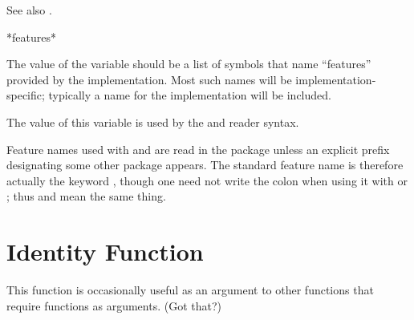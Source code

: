 \noindent
See also .



\begin{defun}[Variable]
*features*

The value of the variable  should be a list of symbols
that name ``features'' provided by the implementation.
Most such names will be implementation-specific; typically
a name for the implementation will be included.


The value of this variable is used by the \cd{\#+} and \cd{\#-}
reader syntax.


Feature names used with \cd{\#+} and \cd{\#-}
are read in the  package unless an explicit prefix
designating some other package appears.  The standard
feature name  is therefore actually the
keyword , though one need not write the colon
when using it with \cd{\#+} or \cd{\#-}; thus 
and  mean the same thing.

\end{defun}


\section{Identity Function}


This function is occasionally useful as an argument to
other functions that require functions as arguments.  (Got that?)



